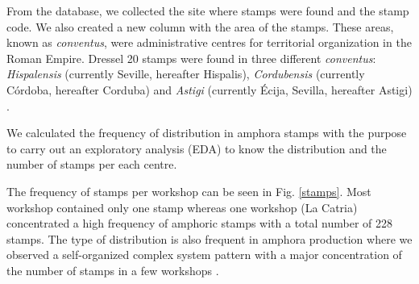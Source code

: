 \documentclass[review]{elsarticle}
\newcommand{\memo}[2]{\textcolor{#1}{#2}}
\newcommand{\xavi}[1]{\memo{magenta}{XRC: #1\\}}
\begin{document}

From the database, we collected the site where stamps were found and the stamp code. We also created a new column with the area of the stamps. These areas, known as \textit{conventus}, were administrative centres for territorial organization in the Roman Empire. Dressel 20 stamps were found in three different \textit{conventus}: \textit{Hispalensis} (currently Seville, hereafter Hispalis), \textit{Cordubensis} (currently C\'ordoba, hereafter Corduba) and \textit{Astigi} (currently Écija, Sevilla, hereafter Astigi) \citep{rodriguez_economioleicola_1977,
chicdatos2001,berni_millet_epigrafianforica_2008} .

We calculated the frequency of distribution in amphora stamps with the purpose to carry out an exploratory analysis (EDA) to know the distribution and the number of stamps per each centre.  

The frequency of stamps per workshop can be seen in Fig. \ref{stamps}. Most 
workshop contained only one stamp whereas one workshop (La Catria) concentrated a high frequency of amphoric stamps with a total number of 228 stamps. The type of distribution is also frequent in amphora production where we observed a self-organized complex system pattern with a major concentration of the number of stamps in a few workshops \citep{bayesian_2018,coto-sarmiento_identifying_2018}.


\end{document}
